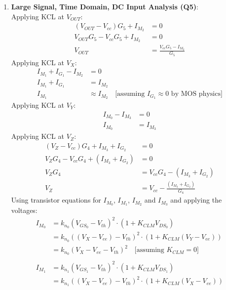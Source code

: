 \begin{enumerate}
  \item \textbf{Large Signal, Time Domain, DC Input Analysis (Q5)}:\\
    Applying KCL at $V_{OUT}$:
    \begin{align*}
      (V_{OUT} - V_{cc})G_5 + I_{M_2} &= 0 \\
      V_{OUT}G_5 - V_{cc}G_5 + I_{M_2} &= 0 \\
      V_{OUT} &= \frac{V_{cc}G_5 - I_{M_2}}{G_5} \tag{1}
    \end{align*}
    Applying KCL at $V_{X}$:
    \begin{align*}
      I_{M_1} + I_{G_1} - I_{M_2} &= 0 \\
      I_{M_1} + I_{G_1} &= I_{M_2} \\
      I_{M_1} &\approx I_{M_2} \quad \text{[assuming } I_{G_1} \approx 0 \text{ by MOS physics]} \tag{2}
    \end{align*}
    Applying KCL at $V_{Y}$:
    \begin{align*}
      I_{M_0} - I_{M_3} &= 0 \\
      I_{M_0} &= I_{M_3} \tag{3}
    \end{align*}
    Applying KCL at $V_{Z}$:
    \begin{align*}
      (V_{Z} - V_{cc})G_4 + I_{M_3} + I_{G_2} &= 0 \\
      V_{Z}G_4 - V_{cc}G_4 + (I_{M_3} + I_{G_2}) &= 0 \\
      V_{Z}G_4 &= V_{cc}G_4 - (I_{M_3} + I_{G_2}) \\
      V_{Z} &= V_{cc} - \frac{(I_{M_3} + I_{G_2})}{G_4} \tag{4}
    \end{align*}
    Using transistor equations for $I_{M_0}$, $I_{M_1}$, $I_{M_2}$ and $I_{M_3}$
    and applying the voltages:
    \begin{align*}
      I_{M_0} &= k_{n_0}(V_{GS_0} - V_{th})^2 \cdot (1 + K_{CLM} V_{DS_0}) \\
              &= k_{n_0}((V_{X} - V_{ee}) - V_{th})^2 \cdot (1 + K_{CLM} (V_{Y} - V_{ee})) \\
              &= k_{n_0}(V_{X} - V_{ee} - V_{th})^2 \quad \text{[assuming } K_{CLM} = 0 \text{]} \tag{5} \\ \\
      I_{M_1} &= k_{n_1}(V_{GS_1} - V_{th})^2 \cdot (1 + K_{CLM} V_{DS_1}) \\
              &= k_{n_1}((V_{X} - V_{ee}) - V_{th})^2 \cdot (1 + K_{CLM} (V_{X} - V_{ee})) \\

\end{align*}
\end{enumerate}
